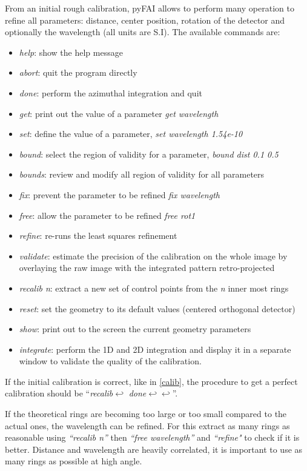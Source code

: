 \documentclass[preprint]{iucr}
\begin{document}
From an initial rough calibration, pyFAI allows to perform many operation to
refine all parameters: distance, center position, rotation of the detector and
optionally the wavelength (all units are S.I).
The available commands are:
\begin{itemize}
\item \textit{help}: show the help message
\item \textit{abort}: quit the program directly
\item \textit{done}: perform the azimuthal integration and quit
\item \textit{get}: print out the value of a parameter \textit{get wavelength}
\item \textit{set}: define the value of a parameter, \textit{set wavelength 1.54e-10}
\item \textit{bound}: select the region of validity for a parameter, \textit{bound
dist 0.1 0.5}
\item \textit{bounds}: review and modify all region of validity for all parameters
\item \textit{fix}: prevent the parameter to be refined \textit{fix wavelength}
\item \textit{free}: allow the parameter to be refined \textit{free rot1}
\item \textit{refine}: re-runs the least squares refinement
\item \textit{validate}: estimate the precision of the calibration on the whole
image by overlaying the raw image with the integrated pattern retro-projected
\item \textit{recalib n}: extract a new set of control points from the
\textit{n} inner most rings
\item \textit{reset}: set the geometry to its default values (centered orthogonal detector)
\item \textit{show}: print out to the screen the current geometry parameters
\item \textit{integrate}: perform the 1D and 2D integration and display it in a
separate window to validate the quality of the calibration.
\end{itemize}

If the initial calibration is correct, like in \ref{calib}, the procedure
to get a perfect calibration should be ``\textit{recalib}$\hookleftarrow $
\textit{done}$\hookleftarrow \hookleftarrow $''.

If the theoretical rings are becoming too large or too small compared to the
actual ones, the wavelength can be refined. For this extract as many rings as
reasonable using \textit{``recalib n''} then \textit{``free wavelength''} and
\textit{``refine"} to check if it is better.
Distance and wavelength are
heavily correlated, it is important to use as many rings as possible at high angle.
\end{document}
